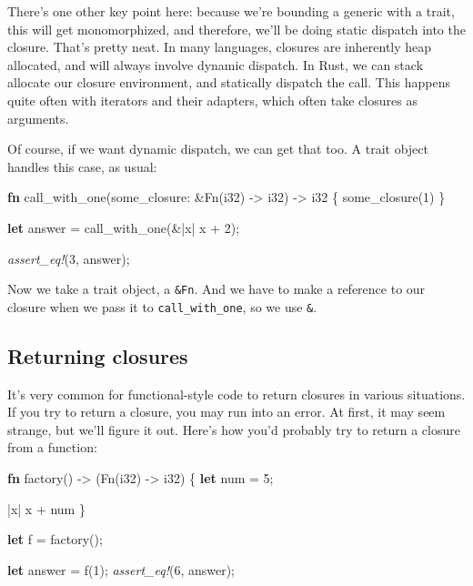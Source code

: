 \documentclass[a4paper,]{book}
\newenvironment{Shaded}{\begin{snugshade}}{\end{snugshade}}
\newcommand{\KeywordTok}[1]{\textcolor[rgb]{0.13,0.29,0.53}{\textbf{{#1}}}}
\newcommand{\DataTypeTok}[1]{\textcolor[rgb]{0.13,0.29,0.53}{{#1}}}
\newcommand{\DecValTok}[1]{\textcolor[rgb]{0.00,0.00,0.81}{{#1}}}
\newcommand{\BuiltInTok}[1]{{#1}}
\newcommand{\PreprocessorTok}[1]{\textcolor[rgb]{0.56,0.35,0.01}{\textit{{#1}}}}
\newcommand{\NormalTok}[1]{{#1}}
\begin{document}
There's one other key point here: because we're bounding a generic with
a trait, this will get monomorphized, and therefore, we'll be doing
static dispatch into the closure. That's pretty neat. In many languages,
closures are inherently heap allocated, and will always involve dynamic
dispatch. In Rust, we can stack allocate our closure environment, and
statically dispatch the call. This happens quite often with iterators
and their adapters, which often take closures as arguments.

Of course, if we want dynamic dispatch, we can get that too. A trait
object handles this case, as usual:

\begin{Shaded}
\begin{Highlighting}[]
\KeywordTok{fn} \NormalTok{call_with_one(some_closure: &}\BuiltInTok{Fn}\NormalTok{(}\DataTypeTok{i32}\NormalTok{) -> }\DataTypeTok{i32}\NormalTok{) -> }\DataTypeTok{i32} \NormalTok{\{}
    \NormalTok{some_closure(}\DecValTok{1}\NormalTok{)}
\NormalTok{\}}

\KeywordTok{let} \NormalTok{answer = call_with_one(&|x| x + }\DecValTok{2}\NormalTok{);}

\PreprocessorTok{assert_eq!}\NormalTok{(}\DecValTok{3}\NormalTok{, answer);}
\end{Highlighting}
\end{Shaded}

Now we take a trait object, a \texttt{\&Fn}. And we have to make a
reference to our closure when we pass it to \texttt{call\_with\_one}, so
we use \texttt{\&\textbar{}\textbar{}}.

\subsection{Returning closures}\label{returning-closures}

It's very common for functional-style code to return closures in various
situations. If you try to return a closure, you may run into an error.
At first, it may seem strange, but we'll figure it out. Here's how you'd
probably try to return a closure from a function:

\begin{Shaded}
\begin{Highlighting}[]
\KeywordTok{fn} \NormalTok{factory() -> (}\BuiltInTok{Fn}\NormalTok{(}\DataTypeTok{i32}\NormalTok{) -> }\DataTypeTok{i32}\NormalTok{) \{}
    \KeywordTok{let} \NormalTok{num = }\DecValTok{5}\NormalTok{;}

    \NormalTok{|x| x + num}
\NormalTok{\}}

\KeywordTok{let} \NormalTok{f = factory();}

\KeywordTok{let} \NormalTok{answer = f(}\DecValTok{1}\NormalTok{);}
\PreprocessorTok{assert_eq!}\NormalTok{(}\DecValTok{6}\NormalTok{, answer);}
\end{Highlighting}
\end{Shaded}
\end{document}
